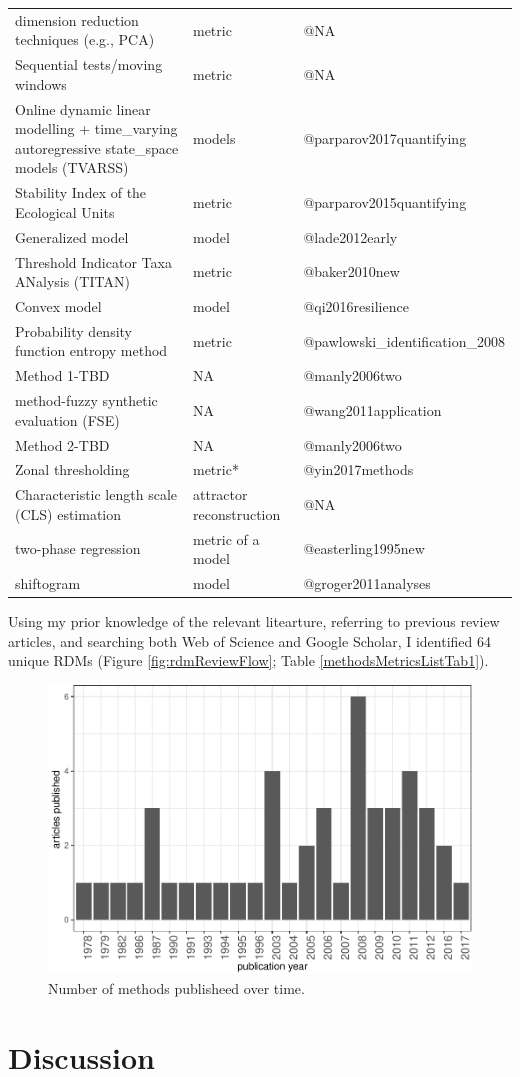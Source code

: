 \documentclass[12pt,twoside,openany]{reedthesis}
\begin{document}
\begin{longtable}{lll}
dimension reduction techniques (e.g., PCA) & metric & @NA\\
\addlinespace
Sequential tests/moving windows & metric & @NA\\
Online dynamic linear modelling +  time\_varying autoregressive state\_space models (TVARSS) & models & @parparov2017quantifying\\
Stability Index of the Ecological Units & metric & @parparov2015quantifying\\
Generalized model & model & @lade2012early\\
Threshold Indicator Taxa ANalysis (TITAN) & metric & @baker2010new\\
\addlinespace
Convex model & model & @qi2016resilience\\
Probability density function entropy method & metric & @pawlowski\_identification\_2008\\
Method 1-TBD & NA & @manly2006two\\
method-fuzzy synthetic evaluation (FSE) & NA & @wang2011application\\
Method 2-TBD & NA & @manly2006two\\
\addlinespace
Zonal thresholding & metric* & @yin2017methods\\
Characteristic length scale (CLS) estimation & attractor reconstruction & @NA\\
two-phase regression & metric of a model & @easterling1995new\\
shiftogram & model & @groger2011analyses\\*
\end{longtable}
Using my prior knowledge of the relevant litearture, referring to previous review articles, and searching both Web of Science and Google Scholar, I identified 64 unique RDMs (Figure \ref{fig:rdmReviewFlow}; Table \ref{methodsMetricsListTab1}).
\begin{figure}

{\centering \includegraphics[width=0.85\linewidth]{_myDissertation_files/figure-latex/jrnlYearFig-1} 

}

\caption{Number of methods publisheed over time.}\label{fig:jrnlYearFig}
\end{figure}
\hypertarget{discussion}{%
\section{Discussion}\label{discussion}}
\end{document}
